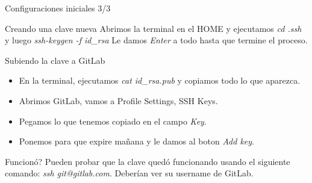 \begin{frame}{Configuraciones iniciales 3/3}
  \begin{block}{Creando una clave nueva}
		Abrimos la terminal en el HOME y ejecutamos \textit{cd .ssh} y luego \textit{ssh-keygen -f id\_rsa}\newline
        Le damos \textit{Enter} a todo hasta que termine el proceso.
	\end{block} 
  \pause
  \begin{block}{Subiendo la clave a GitLab}
		\begin{itemize}
		\item En la terminal, ejecutamos \textit{cat id\_rsa.pub} y copiamos todo lo que aparezca.
      \item Abrimos GitLab, vamos a Profile Settings, SSH Keys.
      \item Pegamos lo que tenemos copiado en el campo \textit{Key}.
      \item Ponemos para que expire mañana y le damos al boton \textit{Add key}.
		\end{itemize}
	\end{block}
    \pause
    \begin{block}{Funcionó?}
        Pueden probar que la clave quedó funcionando usando el siguiente comando: \textit{ssh git@gitlab.com}. Deberían ver su username de GitLab.
    \end{block}

\end{frame}
